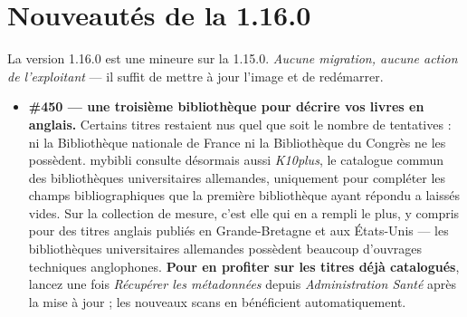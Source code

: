 \section{Nouveautés de la 1.16.0}\label{sec:whats-new-1.16.0}

La version 1.16.0 est une mineure sur la 1.15.0. \emph{Aucune
migration, aucune action de l'exploitant} \string— il suffit de mettre
à jour l'image et de redémarrer.

\begin{itemize}
  \item \textbf{\#450 \string— une troisième bibliothèque pour décrire
        vos livres en anglais.} Certains titres restaient nus quel que
        soit le nombre de tentatives : ni la Bibliothèque nationale de
        France ni la Bibliothèque du Congrès ne les possèdent. mybibli
        consulte désormais aussi \emph{K10plus}, le catalogue commun
        des bibliothèques universitaires allemandes, uniquement pour
        compléter les champs bibliographiques que la première
        bibliothèque ayant répondu a laissés vides. Sur la collection
        de mesure, c'est elle qui en a rempli le plus, y compris pour
        des titres anglais publiés en Grande-Bretagne et aux
        États-Unis \string— les bibliothèques universitaires allemandes
        possèdent beaucoup d'ouvrages techniques anglophones. \textbf{Pour
        en profiter sur les titres déjà catalogués}, lancez une fois
        \emph{Récupérer les métadonnées} depuis
        \emph{Administration \textrightarrow{} Santé} après la mise à
        jour ; les nouveaux scans en bénéficient automatiquement.


\end{itemize}
